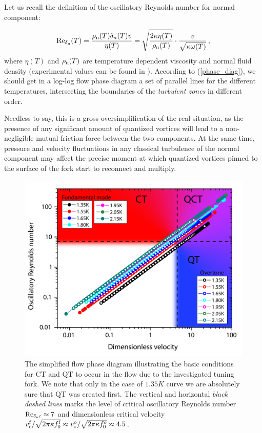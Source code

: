 Let us recall the definition of the oscillatory Reynolds number for normal component:

\begin{equation}
	\text{Re}_{\delta_{\mathrm{n}}}(T) = \frac{\rho_{\mathrm{n}}(T)\delta_{n}(T) v}{\eta(T)}
	= \sqrt{\frac{2\kappa\eta(T)}{\rho_{\mathrm{n}}(T)}}\cdot \frac{v}{\sqrt{\kappa \omega(T)}}\,,
	\label{phase_diag}
\end{equation}
where $ \eta(T) $ and $ \rho_{\mathrm{n}}(T) $ are temperature dependent viscosity and normal fluid density (experimental values can be found in \cite{donnelly}). According to (\ref{phase_diag}), we should get in a log-log flow phase diagram a set of parallel lines for the different temperatures, intersecting the boundaries of the \textit{turbulent zones} in different order.

Needless to say, this is a gross oversimplification of the real situation, as the presence of any significant amount of quantized vortices will lead to a non-negligible mutual friction force between the two components. At the same time, pressure and velocity fluctuations in any classical turbulence of the normal component may affect the precise moment at which quantized vortices pinned to the surface of the fork start to reconnect and multiply.

\begin{figure}[h!]
	\centering
	\includegraphics[width=1\textwidth]{graphs/FlowPhase_diagram}
	\caption{The simplified flow phase diagram illustrating the basic conditions for CT and QT to occur in the flow due to the investigated tuning fork. We note that only in the case of $ 1.35\unit{K} $ curve we are absolutely sure that QT was created first. The vertical and horizontal \textit{black dashed lines} marks the level of critical oscillatory Reynolds number $ \text{Re}_{\delta_{\mathrm{n}}c}\approx 7$ and dimensionless critical velocity $ v_{\mathrm{c}}^{\mathrm{f}}/\sqrt{2\pi \kappa f_0^{\mathrm{f}}} \approx v_{\mathrm{c}}^{\mathrm{o}}/\sqrt{2\pi \kappa f_0^{\mathrm{o}}} \approx 4.5$. }
\end{figure}

